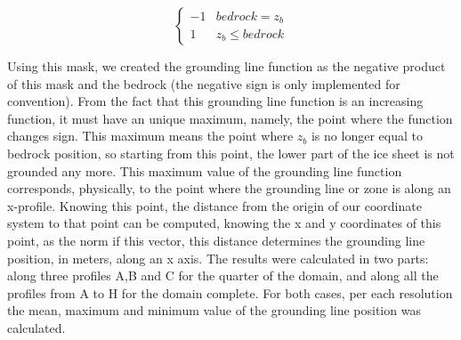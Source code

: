 \documentclass{article}
\begin{document}
\[ \begin{cases} 
	-1 & bedrock = z_b \\
	1 & z_b \leq bedrock   
\end{cases}
\]

Using this mask, we created the grounding line function as the negative product of this mask and the bedrock (the negative sign is only implemented for convention). From the fact that this grounding line function is an increasing function, it must have an unique maximum, namely, the point where the function changes sign. This maximum means the point where $z_b$ is no longer equal to bedrock position, so starting from this point, the lower part of the ice sheet is not grounded any more. This maximum value of the grounding line function corresponds, physically, to the point where the grounding line or zone is along an x-profile. Knowing this point, the distance from the origin of our coordinate system to that point can be computed, knowing the x and y coordinates of this point, as the norm if this vector, this distance determines the grounding line position, in meters, along an x axis. The results were calculated in two parts: along three profiles A,B and C for the quarter of the domain, and along all the profiles from A to H for the domain complete. For both cases, per each resolution the mean, maximum and minimum value of the grounding line position was calculated. 
\end{document}
